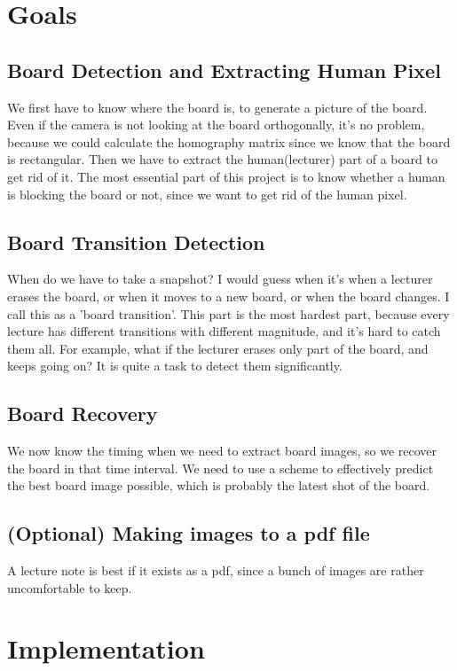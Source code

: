 \documentclass[a4paper]{article}
\begin{document}
\section{Goals}
\subsection{Board Detection and Extracting Human Pixel}
We first have to know where the board is, to generate a picture of the board. Even if the camera is not looking at the board orthogonally, it's no problem, because we could calculate the homography matrix since we know that the board is rectangular. Then we have to extract the human(lecturer) part of a board to get rid of it. The most essential part of this project is to know whether a human is blocking the board or not, since we want to get rid of the human pixel.
\subsection{Board Transition Detection}
When do we have to take a snapshot? I would guess when it's when a lecturer erases the board, or when it moves to a new board, or when the board changes. I call this as a 'board transition'. This part is the most hardest part, because every lecture has different transitions with different magnitude, and it's hard to catch them all. For example, what if the lecturer erases only part of the board, and keeps going on? It is quite a task to detect them significantly.
\subsection{Board Recovery}
We now know the timing when we need to extract board images, so we recover the board in that time interval. We need to use a scheme to effectively predict the best board image possible, which is probably the latest shot of the board.
\subsection{(Optional) Making images to a pdf file}
A lecture note is best if it exists as a pdf, since a bunch of images are rather uncomfortable to keep.

\section{Implementation}
\end{document}
